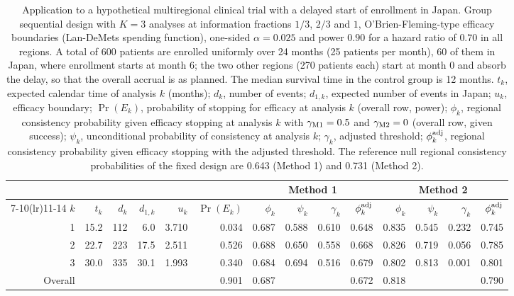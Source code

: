 \begin{table}[ht]
\centering
\footnotesize
\setlength{\tabcolsep}{3.5pt}
\caption{Application to a hypothetical multiregional clinical trial with a delayed start of enrollment in Japan. Group sequential design with $K = 3$ analyses at information fractions $1/3$, $2/3$ and $1$, O'Brien-Fleming-type efficacy boundaries (Lan-DeMets spending function), one-sided $\alpha = 0.025$ and power $0.90$ for a hazard ratio of $0.70$ in all regions. A total of $600$ patients are enrolled uniformly over 24 months (25 patients per month), 60 of them in Japan, where enrollment starts at month 6; the two other regions (270 patients each) start at month 0 and absorb the delay, so that the overall accrual is as planned. The median survival time in the control group is 12 months. $t_{k}$, expected calendar time of analysis $k$ (months); $d_{k}$, number of events; $d_{1,k}$, expected number of events in Japan; $u_{k}$, efficacy boundary; $\Pr(E_{k})$, probability of stopping for efficacy at analysis $k$ (overall row, power); $\phi_{k}$, regional consistency probability given efficacy stopping at analysis $k$ with $\gamma_{\rm M1} = 0.5$ and $\gamma_{\rm M2} = 0$ (overall row, given success); $\psi_{k}$, unconditional probability of consistency at analysis $k$; $\gamma_{k}$, adjusted threshold; $\phi^{\rm adj}_{k}$, regional consistency probability given efficacy stopping with the adjusted threshold. The reference null regional consistency probabilities of the fixed design are 0.643 (Method 1) and 0.731 (Method 2).}
\label{tab:application}
\begin{tabular}{rrrrrr rrrr rrrr}
\toprule
 & & & & & & \multicolumn{4}{c}{Method 1} & \multicolumn{4}{c}{Method 2} \\
\cmidrule(lr){7-10}\cmidrule(lr){11-14}
$k$ & $t_{k}$ & $d_{k}$ & $d_{1,k}$ & $u_{k}$ & $\Pr(E_{k})$ & $\phi_{k}$ & $\psi_{k}$ & $\gamma_{k}$ & $\phi^{\rm adj}_{k}$ & $\phi_{k}$ & $\psi_{k}$ & $\gamma_{k}$ & $\phi^{\rm adj}_{k}$ \\
\midrule
1 & 15.2 & 112 & 6.0 & 3.710 & 0.034 & 0.687 & 0.588 & 0.610 & 0.648 & 0.835 & 0.545 & 0.232 & 0.745 \\
2 & 22.7 & 223 & 17.5 & 2.511 & 0.526 & 0.688 & 0.650 & 0.558 & 0.668 & 0.826 & 0.719 & 0.056 & 0.785 \\
3 & 30.0 & 335 & 30.1 & 1.993 & 0.340 & 0.684 & 0.694 & 0.516 & 0.679 & 0.802 & 0.813 & 0.001 & 0.801 \\
\midrule
Overall &  &  &  &  & 0.901 & 0.687 &  &  & 0.672 & 0.818 &  &  & 0.790 \\
\bottomrule
\end{tabular}
\end{table}

